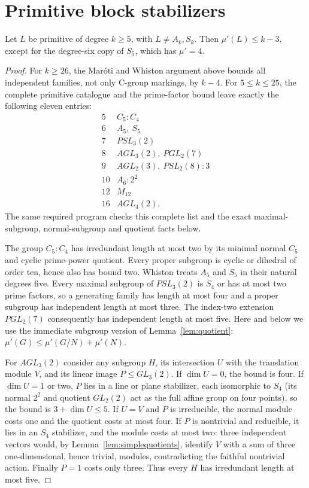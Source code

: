 \section{Primitive block stabilizers}
\begin{lemma}\label{lem:primitiveindependent}
Let $L$ be primitive of degree $k\geq5$, with $L\ne A_k,S_k$.
Then $\mu'(L)\leq k-3$, except for the degree-six copy of $S_5$,
which has $\mu'=4$.
\end{lemma}
\begin{proof}
For $k\geq26$, the Mar\'oti and Whiston argument above bounds all
independent families, not only C-group markings, by $k-4$.
For $5\leq k\leq25$, the complete primitive catalogue and the
prime-factor bound leave exactly the following eleven entries:
\begin{equation}\label{eq:independentexceptions}
\begin{array}{c|l}
5& C_5:C_4\\
6& A_5,\ S_5\\
7& PSL_3(2)\\
8& AGL_3(2),\ PGL_2(7)\\
9& AGL_2(3),\ PSL_2(8):3\\
10& A_6:2^2\\
12& M_{12}\\
16& AGL_4(2).
\end{array}                                                    \end{equation}
The same required program checks this complete list and the exact
maximal-subgroup, normal-subgroup and quotient facts below.

The group $C_5:C_4$ has irredundant length at most two by its minimal
normal $C_5$ and cyclic prime-power quotient. Every proper subgroup
is cyclic or dihedral of order ten, hence also has bound two.
Whiston treats $A_5$ and $S_5$ in their natural degrees five.
Every maximal subgroup of $PSL_3(2)$ is $S_4$ or has at most two prime
factors, so a generating family has length at most four and a proper
subgroup has independent length at most three. The index-two extension
$PGL_2(7)$ consequently has independent length at most five.
Here and below we use the immediate subgroup version of
Lemma~\ref{lem:quotient}: $\mu'(G)\leq\mu'(G/N)+\mu'(N)$.

For $AGL_3(2)$ consider any subgroup $H$, its intersection $U$ with
the translation module $V$, and its linear image $P\leq GL_3(2)$.
If $\dim U=0$, the bound is four. If $\dim U=1$ or two, $P$ lies
in a line or plane stabilizer, each isomorphic to $S_4$ (its normal $2^2$ and quotient $GL_2(2)$
act as the full affine group on four points), so the bound
is $3+\dim U\leq5$. If $U=V$ and $P$ is irreducible, the normal
module costs one and the quotient costs at most four. If $P$ is
nontrivial and reducible, it lies in an $S_4$ stabilizer, and the
module costs at most two: three independent vectors would, by
Lemma~\ref{lem:simplequotients}, identify $V$ with a sum of three
one-dimensional, hence trivial, modules, contradicting the faithful
nontrivial action. Finally $P=1$ costs only three. Thus every $H$
has irredundant length at most five.


\end{proof}
